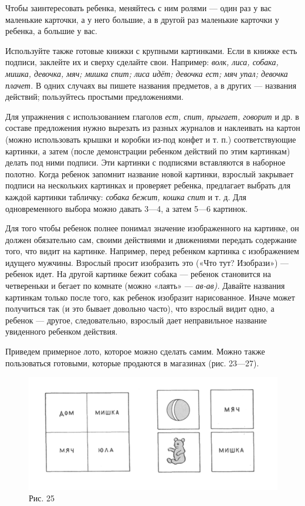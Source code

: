 \documentclass{book}
\renewcommand{\emph}[1]{\textit{#1}}
\begin{document}
Чтобы заинтересовать ребенка, меняйтесь с ним ролями --- один раз у вас
маленькие карточки, а у него большие, а в другой раз маленькие карточки
у ребенка, а большие у вас.

Используйте также готовые книжки с крупными картинками. Если в книжке
есть подписи, заклейте их и сверху сделайте свои. Например: \emph{волк,
лиса, собака, мишка, девочка, мяч; мишка спит; лиса идёт; девочка ест;
мяч упал; девочка плачет.} В одних случаях вы пишете названия предметов,
а в других --- названия действий; пользуйтесь простыми предложениями.

Для упражнения с использованием глаголов \emph{ест, спит, прыгает,
говорит} и др. в составе предложения нужно вырезать из разных журналов и
наклеивать на картон (можно использовать крышки и коробки из-под конфет
и т. п.) соответствующие картинки, а затем (после демонстрации ребенком
действий по этим картинкам) делать под ними подписи. Эти картинки с
подписями вставляются в наборное полотно. Когда ребенок запомнит
название новой картинки, взрослый закрывает подписи на нескольких
картинках и проверяет ребенка, предлагает выбрать для каждой картинки
табличку: \emph{собака бежит, кошка спит} и т. д. Для одновременного
выбора можно давать 3---4, а затем 5---6 картинок.

Для того чтобы ребенок полнее понимал значение изображенного на
картинке, он должен обязательно сам, своими действиями и движениями
передать содержание того, что видит на картинке. Например, перед
ребенком картинка с изображением идущего мужчины. Взрослый просит
изобразить это («Что тут? Изобрази») --- ребенок идет. На другой
картинке бежит собака --- ребенок становится на четвереньки и бегает по
комнате (можно «лаять» --- \emph{ав-ав).} Давайте названия картинкам
только после того, как ребенок изобразит нарисованное. Иначе может
получиться так (и это бывает довольно часто), что взрослый видит одно, а
ребенок --- другое, следовательно, взрослый дает неправильное название
увиденного ребенком действия.

Приведем примерное лото, которое можно сделать самим. Можно также
пользоваться готовыми, которые продаются в магазинах (рис. 23---27).

\begin{figure}
\centering
\includegraphics[width=\linewidth]{media/media/image22.png}
\caption*{Рис. 25}
\end{figure}
\end{document}
